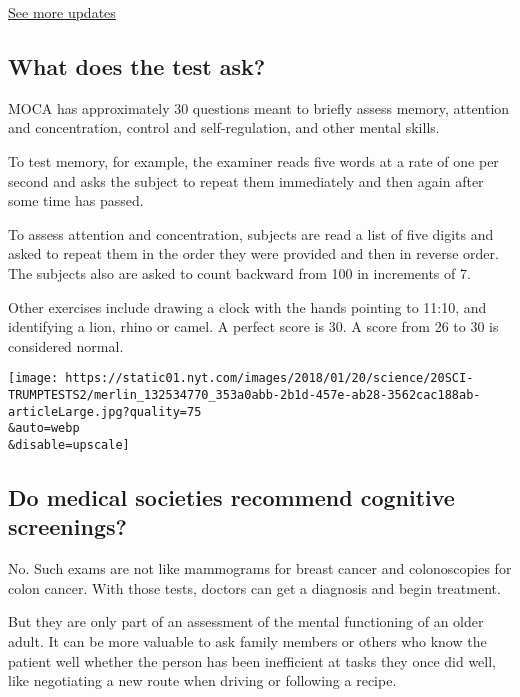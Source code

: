 \href{https://www.nytimes.com/2020/07/31/us/elections/biden-vs-trump.html?action=click\&pgtype=Article\&state=default\&region=MAIN_CONTENT_1\&context=storylines_live_updates}{See
more updates}

\hypertarget{what-does-the-test-ask}{%
\subsection{What does the test ask?}\label{what-does-the-test-ask}}

MOCA has approximately 30 questions meant to briefly assess memory,
attention and concentration, control and self-regulation, and other
mental skills.

To test memory, for example, the examiner reads five words at a rate of
one per second and asks the subject to repeat them immediately and then
again after some time has passed.

To assess attention and concentration, subjects are read a list of five
digits and asked to repeat them in the order they were provided and then
in reverse order. The subjects also are asked to count backward from 100
in increments of 7.

Other exercises include drawing a clock with the hands pointing to
11:10, and identifying a lion, rhino or camel. A perfect score is 30. A
score from 26 to 30 is considered normal.

\texttt{[image: https://static01.nyt.com/images/2018/01/20/science/20SCI-TRUMPTESTS2/merlin\_132534770\_353a0abb-2b1d-457e-ab28-3562cac188ab-articleLarge.jpg?quality=75\\\&auto=webp\\\&disable=upscale]}

\hypertarget{do-medical-societies-recommend-cognitive-screenings}{%
\subsection{Do medical societies recommend cognitive
screenings?}\label{do-medical-societies-recommend-cognitive-screenings}}

No. Such exams are not like mammograms for breast cancer and
colonoscopies for colon cancer. With those tests, doctors can get a
diagnosis and begin treatment.

But they are only part of an assessment of the mental functioning of an
older adult. It can be more valuable to ask family members or others who
know the patient well whether the person has been inefficient at tasks
they once did well, like negotiating a new route when driving or
following a recipe.


